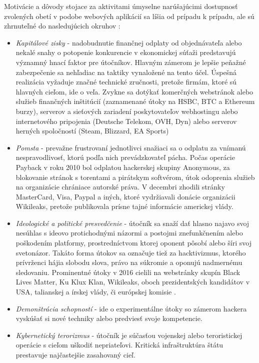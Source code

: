 \documentclass[12pt, a4paper]{article}
\begin{document}
Motivácie a dôvody stojace za aktivitami úmyselne narúšajúcimi dostupnosť zvolených obetí v podobe
webových aplikácií sa líšia od prípadu k prípadu, ale sú zhrnuteľné do nasledujúcich okruhov 
\cite{why-attack} \cite{ddos-attacks}:
\begin{itemize}
\itemsep0em 
\item \emph{Kapitálové zisky} - nadobudnutie finančnej odplaty od objednávateľa alebo nekalé snahy o 
potopenie konkurencie v ekonomickej súťaži predstavujú významný hnací faktor pre útočníkov. 
Hlavným zámerom je lepšie peňažné zabezpečenie sa nehľadiac na taktiky vynaložené na tento účel. 
Úspešná realizácia vyžaduje značné technické zručnosti, pretože firmám, ktoré sú hlavných cieľom,
ide o veľa. Zvykne sa dotýkať komerčných webstránok alebo služieb finančných inštitúcií (zaznamenané útoky 
na HSBC, BTC a Ethereum burzy), serverov a sieťových zariadení poskytovateľov webhostingu alebo 
internetového pripojenia (Deutsche Telekom, OVH, Dyn) alebo serverov herných spoločností (Steam, Blizzard, 
EA Sports) \cite{why-attack}

\item \emph{Pomsta} - prevažne frustrovaní jednotlivci snažiaci sa o odplatu za vnímanú 
nespravodlivosť, ktorú podľa nich prevádzkovateľ pácha. Počas operácie Payback v roku 2010 bol odplatou
hackerskej skupiny Anonymous, za blokovanie stránok s torentami a pirátskym softvérom, útok odoprenia 
služieb na organizácie chrániace autorské práva. V decembri zhodili stránky MasterCard, Visa, Paypal a 
iných, ktoré vydržiavali donácie organizácii Wikileaks, pretože publikovala prísne tajné informácie
americkej vlády.

\item \emph{Ideologické a politické presvedčenie} - útočník sa snaží dať hlasno najavo svoj nesúhlas s 
ideovo protichodnými názormi a postojmi znefunkčnením alebo poškodením platformy, prostredníctvom ktorej 
oponent pôsobí alebo šíri svoj svetonázor. Takáto forma útokov sa označuje tiež za hacktivizmus, ktorého 
prívrženci hájia slobodu slova, právo na súkromie a oponujú nadmernému sledovaniu. Prominentné útoky v 2016 
cielili na webstránky skupín Black Lives Matter, Ku Klux Klan, Wikileaks, oboch prezidentských kandidátov v 
USA, talianskej a írskej vlády, či európskej komisie \cite{why-attack}.

\item \emph{Demonštrácia schopností} - ide o experimentálne útoky so zámerom hackera vyskúšať si nové 
techniky alebo predviesť svoje kompetencie.
 
\item\emph{Kybernetický terorizmus} - útočník je súčasťou vojenskej alebo teroristickej operácie s cieľom
uškodiť nepriateľovi. Kritická infraštruktúra štátu prestavuje najčastejšie zasahovaný cieľ.
\end{itemize}
\end{document}
